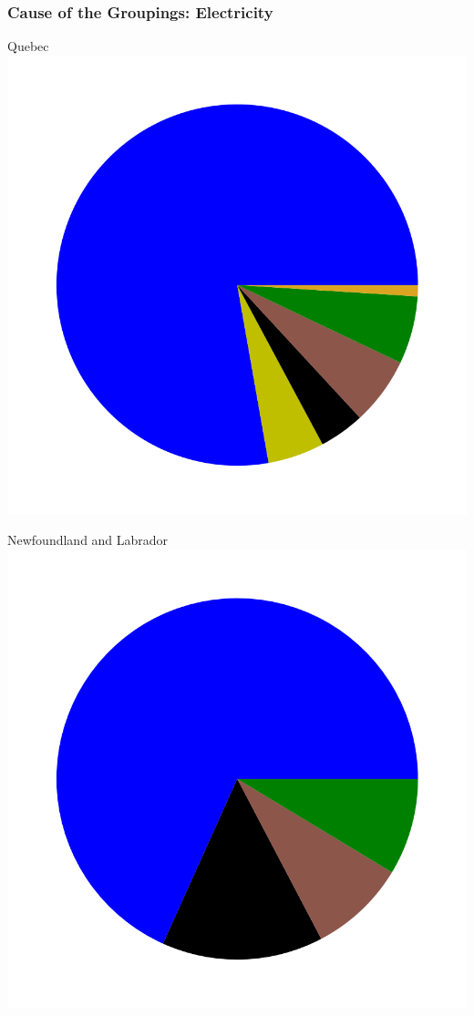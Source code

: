 \documentclass{beamer}
\begin{document}
\begin{frame}
\frametitle{Cause of the Groupings: Electricity}
\vspace{-25pt}
\begin{minipage}[b]{0.33\textwidth}
\begin{center}
Quebec
\includegraphics[width=\linewidth, trim={40pt 70pt 40pt 30pt}, clip]{Quebec2017.png}%
\end{center}
\end{minipage}%
%
\begin{minipage}[b]{0.33\textwidth}
\begin{center}
Newfoundland and Labrador
\includegraphics[width=\linewidth, trim={40pt 70pt 40pt 30pt}, clip]{NL2017.png}%

\end{center}
\end{minipage}
\end{frame}
\end{document}
